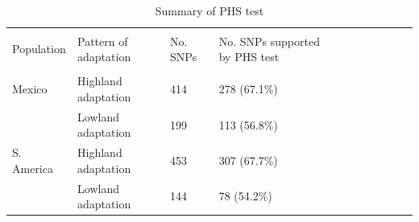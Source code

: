 \renewcommand{\arraystretch}{1.1}
\begin{table}[tb]

\begin{center}
 \caption[]{Summary of PHS test\hspace*{5.3cm}}
  \textbf{}\\[-2mm]
{\fontsize{8}{11}\sf
    \begin{tabular}{lllllcccccl} \hline
       & & \\[-3mm]
     Population  & Pattern of adaptation & No. SNPs & No. SNPs supported by PHS test \\[0.1cm]
    \hline
    & & \\[-3mm]
   Mexico & Highland adaptation & 414 & 278 (67.1\%)  \\
               & Lowland adaptation & 199 & 113 (56.8\%)  \\
   S. America & Highland adaptation & 453 & 307 (67.7\%)  \\
                     & Lowland adaptation & 144 & 78 (54.2\%)  \\[0.1cm]
    \hline
    \end{tabular}
    \label{phs}  %
}
\end{center}
\end{table}
\renewcommand{\arraystretch}{1}



